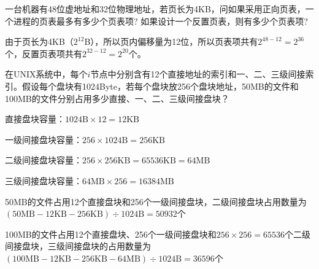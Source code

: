 \begin{problem}
一台机器有48位虚地址和32位物理地址，若页长为4KB，问如果采用正向页表，一个进程的页表最多有多少个页表项? 如果设计一个反置页表，则有多少个页表项?
\end{problem}

\begin{solution}
    由于页长为4KB（$2^{12}$B），所以页内偏移量为12位，所以页表项共有$2^{48-12}=2^{36}$个，反置页表项共有$2^{32-12}=2^{20}$个。
\end{solution}


\begin{problem}
 在UNIX系统中，每个$i$节点中分别含有12个直接地址的索引和一、二、三级间接索引。假设每个盘块有1024Byte，若每个盘块放256个盘块地址，50MB的文件和100MB的文件分别占用多少直接、一、二、三级间接盘块？
\end{problem}

\begin{solution}
直接盘块容量：$1024\mathrm{B}\times 12=12\mathrm{KB}$

一级间接盘块容量：$256 \times 1024\mathrm{B}=256\mathrm{KB}$

二级间接盘块容量：$256 \times 256\mathrm{KB}=65536\mathrm{KB}=64\mathrm{MB}$

三级间接盘块容量：$64\mathrm{MB} \times 256=16384\mathrm{MB}$

50MB的文件占用12个直接盘块和256个一级间接盘块，二级间接盘块占用数量为$(50\mathrm{MB}-12\mathrm{KB}-256\mathrm{KB})\div 1024\mathrm{B}=50932$个

100MB的文件占用12个直接盘块、256个一级间接盘块和$256\times 256=65536$个二级间接盘块，三级间接盘块的占用数量为$(100\mathrm{MB}-12\mathrm{KB}-256\mathrm{KB}-64\mathrm{MB})\div 1024\mathrm{B}=36596$个

\end{solution}



